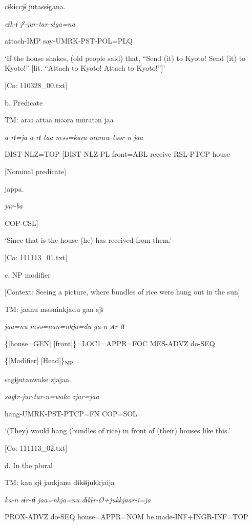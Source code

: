       cɨkɨccjɨ  jutassɨgana.

      \textit{cɨk-ɨ}  \textit{jˀ-jur-tar-sɨga=na}

      attach-IMP  say-UMRK-PST-POL=PLQ

      ‘If the house shakes, (old people said) that, “Send (it) to Kyoto! Send (it) to Kyoto!” [lit. “Attach to Kyoto! Attach to Kyoto!”]’

      [Co: 110328\_00.txt]

  b.  Predicate

    TM:  arəə  attaa  məəra  muratən  jaa

      \textit{a-rɨ=ja}  \textit{a-rɨ-taa}  \textit{məə=kara}  \textit{muraw-təər-n}  \textit{jaa}

      DIST-NLZ=TOP  [DIST-NLZ-PL  front=ABL  receive-RSL-PTCP  house

        [Nominal predicate]

      jappa.

      \textit{jar-ba}

      COP-CSL]

      ‘Since that is the house (he) has received from them.’

      [Co: 111113\_01.txt]

  c.  NP modifier

    [Context: Seeing a picture, where bundles of rice were hung out in the sun]

    TM:  jaanu  məəninkjadu  gan  sjɨ

      \textit{jaa=nu}  \textit{məə=nan=nkja=du}  \textit{ga-n}  \textit{sɨr-tɨ}

      \{[house=GEN]  [front]\}=LOC1=APPR=FOC  MES-ADVZ  do-SEQ

      \{[Modifier]  [Head]\}\textsubscript{NP}    

      sagɨjutanwake  zjajaa.

      \textit{sagɨr-jur-tar-n=wake}  \textit{zjar=jaa}

      hang-UMRK-PST-PTCP=FN  COP=SOL

      ‘(They) would hang (bundles of rice) in front of (their) houses like this.’

      [Co: 111113\_02.txt]

  d.  In the plural

    TM:  kan  sjɨ  jankjanu  dɨkɨɨjukkjaija

      \textit{ka-n}  \textit{sɨr-tɨ}  \textit{jaa=nkja=nu}  \textit{dɨkɨr-Ø+jukkjaar-i=ja}

      PROX-ADVZ  do-SEQ  house=APPR=NOM  be.made-INF+INGR-INF=TOP

